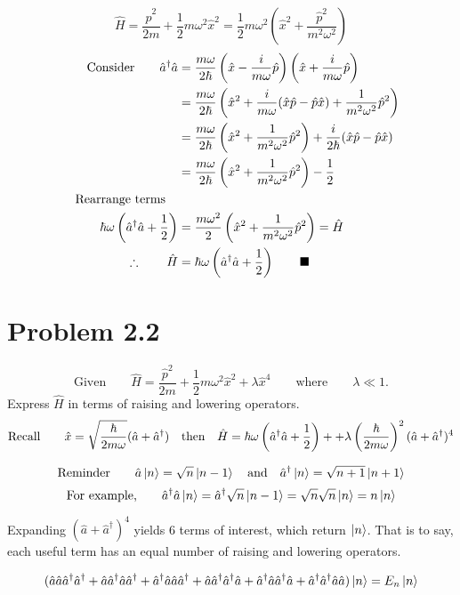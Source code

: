 \documentclass{amsart}
\begin{document}
\[\hat{H}=\frac{\hat{p}^2}{2m}+\frac{1}{2}m\omega^2\hat{x}^2=\frac{1}{2}m\omega^2\left(\hat{x}^2+\frac{\hat{p}^2}{m^2\omega^2}\right) \]
\begin{align*}
    \text{Consider}\qquad \hat{a}^\dagger \hat{a} &=\frac{m\omega}{2\hbar}\left(\hat{x} - \frac{i}{m\omega}\hat{p}\right)\left(\hat{x} + \frac{i}{m\omega}\hat{p}\right)\\
    &=\frac{m\omega}{2\hbar}\left(\hat{x}^2 + \frac{i}{m\omega}(\hat{x}\hat{p}-\hat{p}\hat{x}) + \frac{1}{m^2\omega^2}\hat{p}^2\right)\\
    &=\frac{m\omega}{2\hbar}\left(\hat{x}^2 + \frac{1}{m^2\omega^2}\hat{p}^2\right) + \frac{i}{2\hbar}(\hat{x}\hat{p}-\hat{p}\hat{x})\\
    &=\frac{m\omega}{2\hbar}\left(\hat{x}^2 + \frac{1}{m^2\omega^2}\hat{p}^2\right) - \frac{1}{2}\\
    \qq{Rearrange terms}\\
    \hbar\omega\left(\hat{a}^\dagger \hat{a} +\frac{1}{2}\right)&=\frac{m\omega^2}{2}\left(\hat{x}^2 + \frac{1}{m^2\omega^2}\hat{p}^2\right)= \hat{H}\\
    \therefore\qquad\hat{H}&=\hbar\omega\left(\hat{a}^\dagger \hat{a} +\frac{1}{2}\right)\qquad\blacksquare
\end{align*}


\section*{Problem 2.2}
\[\text{Given}\qquad\hat{H}=\frac{\hat{p}^2}{2m}+\frac{1}{2}m\omega^2\hat{x}^2+\lambda\hat{x}^4\qquad\text{where}\qquad \lambda\ll 1. \]
Express $\hat{H}$ in terms of raising and lowering operators.
\[\text{Recall}\qquad\hat{x}=\sqrt{\frac{\hbar}{2m\omega}}(\hat{a}+\hat{a}^\dagger)\qq{then}\hat{H}=\hbar\omega\left(\hat{a}^\dagger \hat{a} +\frac{1}{2}\right)++\lambda\left(\frac{\hbar}{2m\omega}\right)^2(\hat{a}+\hat{a}^\dagger)^4   \]

\[\text{Reminder}\qquad\hat{a}\ket{n} =\sqrt{n}\ket{n-1} \qq{and} \hat{a}^\dagger\ket{n} =\sqrt{n+1}\ket{n+1}  \]
\[\text{For example,}\qquad\hat{a}^\dagger\hat{a}\ket{n} =\hat{a}^\dagger\sqrt{n}\ket{n-1}=\sqrt{n}\sqrt{n}\ket{n}=n\ket{n} \]

Expanding $(\hat{a}+\hat{a}^\dagger)^4$ yields 6 terms of interest, which return $\ket{n}$. That is to say, each useful term has an equal number of raising and lowering operators.

\[(\hat{a}\hat{a}\hat{a}^\dagger\hat{a}^\dagger+\hat{a}\hat{a}^\dagger\hat{a}\hat{a}^\dagger+\hat{a}^\dagger\hat{a}\hat{a}\hat{a}^\dagger+\hat{a}\hat{a}^\dagger\hat{a}^\dagger\hat{a}+\hat{a}^\dagger\hat{a}\hat{a}^\dagger\hat{a}+\hat{a}^\dagger\hat{a}^\dagger\hat{a}\hat{a})\ket{n}=E_n\ket{n}\]
\end{document}
